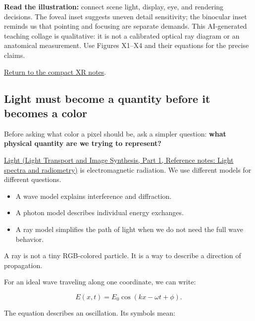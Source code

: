 \textbf{Read the illustration:} connect scene light, display, eye, and rendering decisions. The foveal inset suggests uneven detail sensitivity; the binocular inset reminds us that pointing and focusing are separate demands. This AI-generated teaching collage is qualitative: it is not a calibrated optical ray diagram or an anatomical measurement. Use Figures X1--X4 and their equations for the precise claims.

\hyperref[appendix-73c6b8ed5a87-figure-linked-short-notes]{Return to the compact XR notes}.

\subsection{Light must become a quantity before it becomes a color}\label{04-visual-computing-ii-ch042-light-must-become-a-quantity-before-it-becomes-a-color}

\hypertarget{04-visual-computing-ii-ch042-light-must-become-a-quantity-before-it-becomes-a-color}{}

Before asking what color a pixel should be, ask a simpler question: \textbf{what physical quantity are we trying to represent?}

\href{../04-Light-Transport-and-Image-Synthesis-P01/main.pdf\#nameddest=appendix-215c2570199b}{Light (Light Transport and Image Synthesis, Part 1, Reference notes: Light spectra and radiometry)} is electromagnetic radiation. We use different models for different questions.

\begin{itemize}
\tightlist
\item
  A wave model explains interference and diffraction.
\item
  A photon model describes individual energy exchanges.
\item
  A ray model simplifies the path of light when we do not need the full wave behavior.
\end{itemize}

A ray is not a tiny RGB-colored particle. It is a way to describe a direction of propagation.

For an ideal wave traveling along one coordinate, we can write:

\[
E(x,t)=E_0\cos(kx-\omega t+\phi).
\]

The equation describes an oscillation. Its symbols mean:

